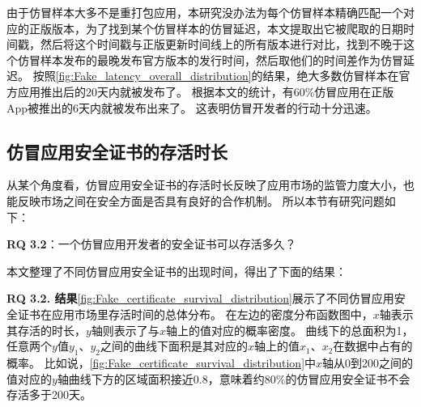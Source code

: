 由于仿冒样本大多不是重打包应用，本研究没办法为每个仿冒样本精确匹配一个对应的正版版本，为了找到某个仿冒样本的仿冒延迟，本文提取出它被爬取的日期时间戳，然后将这个时间戳与正版更新时间线上的所有版本进行对比，找到不晚于这个仿冒样本发布的最晚发布官方版本的发行时间，然后取他们的时间差作为仿冒延迟。
按照\autoref{fig:Fake_latency_overall_distribution}的结果，绝大多数仿冒样本在官方应用推出后的20天内就被发布了。
根据本文的统计，有60\%仿冒应用在正版App被推出的6天内就被发布出来了。
这表明仿冒开发者的行动十分迅速。

\subsection{仿冒应用安全证书的存活时长}
从某个角度看，仿冒应用安全证书的存活时长反映了应用市场的监管力度大小，也能反映市场之间在安全方面是否具有良好的合作机制。
所以本节有研究问题如下：

{\bf RQ 3.2}：一个仿冒应用开发者的安全证书可以存活多久？

本文整理了不同仿冒应用安全证书的出现时间，得出了下面的结果：

{\bf RQ 3.2. 结果}\autoref{fig:Fake_certificate_survival_distribution}展示了不同仿冒应用安全证书在应用市场里存活时间的总体分布。
在左边的密度分布函数图中，$x$轴表示其存活的时长，$y$轴则表示了与$x$轴上的值对应的概率密度。
曲线下的总面积为1，任意两个$y$值$y_1$、$y_2$之间的曲线下面积是其对应的$x$轴上的值$x_1$、$x_2$在数据中占有的概率。
比如说，\autoref{fig:Fake_certificate_survival_distribution}中$x$轴从0到200之间的值对应的$y$轴曲线下方的区域面积接近0.8，意味着约80\%的仿冒应用安全证书不会存活多于200天。

